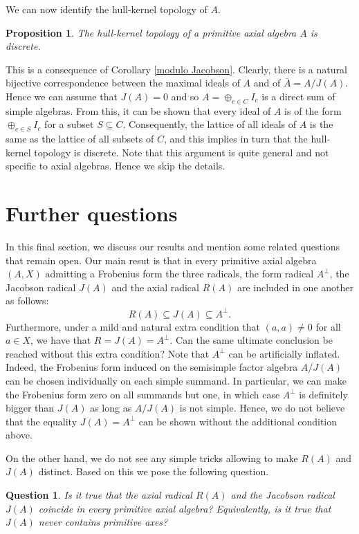 \documentclass[12pt]{article}
\newtheorem{proposition}[theorem]{Proposition}
\newtheorem{question}[theorem]{Question}
\begin{document}
We can now identify the hull-kernel topology of $A$. 

\begin{proposition}
The hull-kernel topology of a primitive axial algebra $A$ is discrete.
\end{proposition}

This is a consequence of Corollary \ref{modulo Jacobson}. Clearly, there is a natural 
bijective correspondence between the maximal ideals of $A$ and of $\bar A=A/J(A)$. 
Hence we can assume that $J(A)=0$ and so $A=\oplus_{c\in C}I_c$ is a direct sum of 
simple algebras. From this, it can be shown that every ideal of $A$ is of the form 
$\oplus_{c\in S}I_c$ for a subset $S\subseteq C$. Consequently, the lattice of all 
ideals of $A$ is the same as the lattice of all subsets of $C$, and this implies 
in turn that the hull-kernel topology is discrete. Note that this argument is quite 
general and not specific to axial algebras. Hence we skip the details.  

\section{Further questions}

In this final section, we discuss our results and mention some related questions 
that remain open. Our main resut is that in every primitive axial algebra $(A,X)$ 
admitting a Frobenius form the three radicals, the form radical $A^{\perp}$, the 
Jacobson radical $J(A)$ and the axial radical $R(A)$ are included in one another as 
follows: 
%
$$
R(A)\subseteq J(A)\subseteq A^\perp.
$$ 
%
Furthermore, under a mild and natural extra condition that $(a,a)\neq 0$ for all 
$a\in X$, we have that $R=J(A)=A^\perp$. Can the same ultimate conclusion be reached 
without this extra condition? Note that $A^\perp$ can be artificially inflated. 
Indeed, the Frobenius form induced on the semisimple factor algebra $A/J(A)$ can be 
chosen individually on each simple summand. In particular, we can make the Frobenius 
form zero on all summands but one, in which case $A^\perp$ is definitely bigger than
$J(A)$ as long as $A/J(A)$ is not simple. Hence, we do not believe that the equality 
$J(A)=A^\perp$ can be shown without the additional condition above.

On the other hand, we do not see any simple tricks allowing to make $R(A)$ and $J(A)$ 
distinct. Based on this we pose the following question.

\begin{question}
Is it true that the axial radical $R(A)$ and the Jacobson radical $J(A)$ coincide in 
every primitive axial algebra? Equivalently, is it true that $J(A)$ never contains 
primitive axes?
\end{question}
\end{document}
